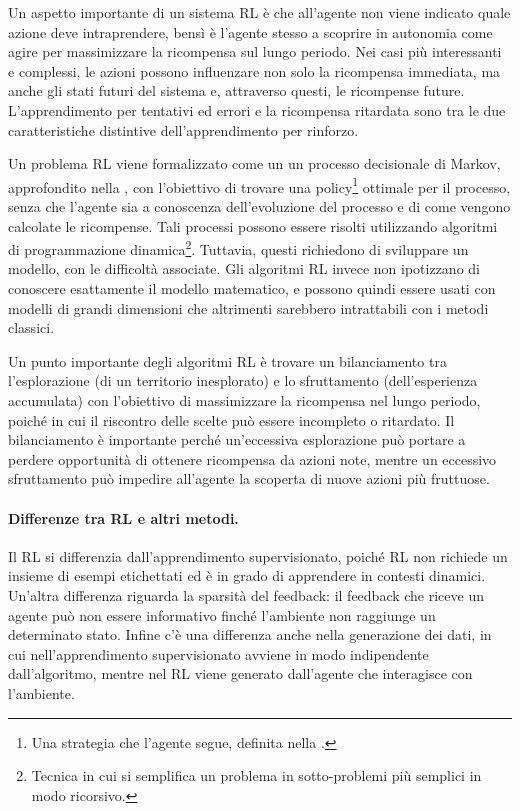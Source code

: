 Un aspetto importante di un sistema RL è che all'agente non viene indicato quale azione deve intraprendere, bensì è l'agente stesso a scoprire in autonomia come agire per massimizzare la ricompensa sul lungo periodo. Nei casi più interessanti e complessi, le azioni possono influenzare non solo la ricompensa immediata, ma anche gli stati futuri del sistema e, attraverso questi, le ricompense future. L'apprendimento per tentativi ed errori e la ricompensa ritardata sono tra le due caratteristiche distintive dell'apprendimento per rinforzo. 

Un problema RL viene formalizzato come un un processo decisionale di Markov, approfondito nella , con l'obiettivo di trovare una policy\footnote{Una strategia che l'agente segue, definita nella .} ottimale per il processo, senza che l'agente sia a conoscenza dell'evoluzione del processo e di come vengono calcolate le ricompense. Tali processi possono essere risolti utilizzando algoritmi di programmazione dinamica\footnote{Tecnica in cui si semplifica un problema in sotto-problemi più semplici in modo ricorsivo.}. Tuttavia, questi richiedono di sviluppare un modello, con le difficoltà associate. Gli algoritmi RL invece non ipotizzano di conoscere esattamente il modello matematico, e possono quindi essere usati con modelli di grandi dimensioni che altrimenti sarebbero intrattabili con i metodi classici.

Un punto importante degli algoritmi RL è trovare un bilanciamento tra l'esplorazione (di un territorio inesplorato) e lo sfruttamento (dell'esperienza accumulata) con l'obiettivo di massimizzare la ricompensa nel lungo periodo, poiché  in cui il riscontro delle scelte può essere incompleto o ritardato. Il bilanciamento è importante perché un'eccessiva esplorazione può portare a perdere opportunità di ottenere ricompensa da azioni note, mentre un eccessivo sfruttamento può impedire all'agente la scoperta di nuove azioni più fruttuose.

\paragraph{Differenze tra RL e altri metodi.} Il RL si differenzia dall'apprendimento supervisionato, poiché RL non richiede un insieme di esempi etichettati ed è in grado di apprendere in contesti dinamici. Un'altra differenza riguarda la sparsità del feedback: il feedback che riceve un agente può non essere informativo finché l'ambiente non raggiunge un determinato stato. Infine c'è una differenza anche nella generazione dei dati, in cui nell'apprendimento supervisionato avviene in modo indipendente dall'algoritmo, mentre nel RL viene generato dall'agente che interagisce con l'ambiente.

